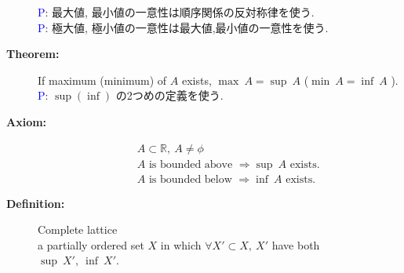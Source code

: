 \documentclass[english,dvipdfmx]{jsarticle}
\newcommand*{\proof}{\textcircled{\textcolor{blue}{\scriptsize P}}}
\begin{document}
\begin{description}
        \proof : 最大値, 最小値の一意性は順序関係の反対称律を使う. \\
        \proof : 極大値, 極小値の一意性は最大値,最小値の一意性を使う.
    \item[\bf{Theorem:}] If maximum (minimum) of $A$ exists, $\max \ A = \sup \ A$ ($\min \ A = \inf \ A$ ). \\
        \proof : $\sup(\inf)$ の2つめの定義を使う.
    \item[\bf{Axiom:}] {\color{cyan}{Existance of supremum and infimum}}
        \begin{eqnarray*}
            & &A \subset \mathbb{R},\ A \neq \phi \\
            & &A \text{ is bounded above } \Rightarrow \sup \ A \text{ exists.} \\
            & &A \text{ is bounded below } \Rightarrow \inf \ A \text{ exists.}
        \end{eqnarray*}
    \item[\bf{Definition:}] Complete lattice \\
        a partially ordered set $X$ in which $\forall X' \subset X,\ X'$ have both $\sup \ X',\ \inf \ X'.$
\end{description}
\newpage
\end{document}
